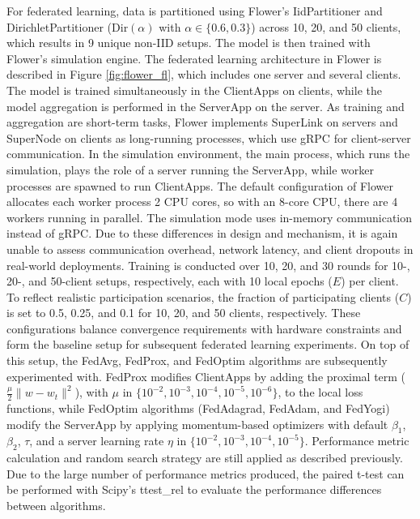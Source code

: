 For federated learning, data is partitioned using Flower's IidPartitioner and DirichletPartitioner ($\text{Dir}(\alpha)$ with $\alpha \in \{0.6, 0.3\}$) across 10, 20, and 50 clients, which results in 9 unique non-IID setups. The model is then trained with Flower's simulation engine. The federated learning architecture in Flower is described in Figure \ref{fig:flower_fl}, which includes one server and several clients. The model is trained simultaneously in the ClientApps on clients, while the model aggregation is performed in the ServerApp on the server. As training and aggregation are short-term tasks, Flower implements SuperLink on servers and SuperNode on clients as long-running processes, which use gRPC for client-server communication. In the simulation environment, the main process, which runs the simulation, plays the role of a server running the ServerApp, while worker processes are spawned to run ClientApps. The default configuration of Flower allocates each worker process 2 CPU cores, so with an 8-core CPU, there are 4 workers running in parallel. The simulation mode uses in-memory communication instead of gRPC. Due to these differences in design and mechanism, it is again unable to assess communication overhead, network latency, and client dropouts in real-world deployments. Training is conducted over 10, 20, and 30 rounds for 10-, 20-, and 50-client setups, respectively, each with 10 local epochs ($E$) per client. To reflect realistic participation scenarios, the fraction of participating clients ($C$) is set to 0.5, 0.25, and 0.1 for 10, 20, and 50 clients, respectively. These configurations balance convergence requirements with hardware constraints and form the baseline setup for subsequent federated learning experiments. On top of this setup, the FedAvg, FedProx, and FedOptim algorithms are subsequently experimented with. FedProx modifies ClientApps by adding the proximal term ($\frac{\mu}{2} \lVert w - w_t \rVert^{2}$), with $\mu$ in $\{10^{-2}, 10^{-3}, 10^{-4}, 10^{-5}, 10^{-6}\}$, to the local loss functions, while FedOptim algorithms (FedAdagrad, FedAdam, and FedYogi) modify the ServerApp by applying momentum-based optimizers with default $\beta_1$, $\beta_2$, $\tau$, and a server learning rate $\eta$ in $\{10^{-2}, 10^{-3}, 10^{-4}, 10^{-5}\}$. Performance metric calculation and random search strategy are still applied as described previously. Due to the large number of performance metrics produced, the paired t-test can be performed with Scipy's ttest\_rel \citep{scipyttp} to evaluate the performance differences between algorithms.

